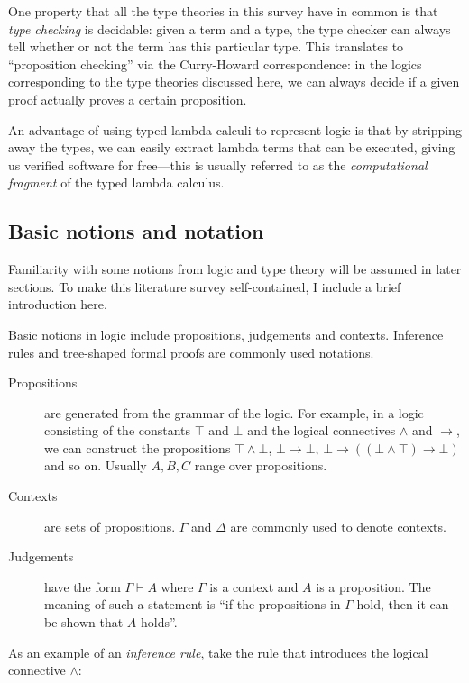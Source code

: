 \documentclass[12pt,toc=bibliography,numbers=noendperiod,
               footnotes=multiple,twoside]{scrartcl}
\begin{document}
One property that all the type theories in this survey have in common is that \emph{type checking} is decidable: given a term and a type, the type checker can always tell whether or not the term has this particular type. This translates to \enquote{proposition checking} via the Curry-Howard correspondence: in the logics corresponding to the type theories discussed here, we can always decide if a given proof actually proves a certain proposition.

An advantage of using typed lambda calculi to represent logic is that by stripping away the types, we can easily extract lambda terms that can be executed, giving us verified software for free---this is usually referred to as the \emph{computational fragment} of the typed lambda calculus.

\subsection{Basic notions and notation}

Familiarity with some notions from logic and type theory will be assumed in later sections. To make this literature survey self-contained, I include a brief introduction here.


Basic notions in logic include propositions, judgements and contexts. Inference rules and tree-shaped formal proofs are commonly used notations.

\begin{description}
\item[Propositions] are generated from the grammar of the logic. For example, in a logic consisting of the constants \(\top\) and \(\bot\) and the logical connectives \(\wedge\) and \(\rightarrow\), we can construct the propositions \(\top \wedge \bot\), \(\bot \rightarrow \bot\), \(\bot \rightarrow ((\bot \wedge \top) \rightarrow \bot)\) and so on. Usually \(A, B, C\) range over propositions.
\item[Contexts] are sets of propositions. \(\Gamma\) and \(\Delta\) are commonly used to denote contexts.
\item[Judgements] have the form \(\Gamma \vdash A\) where \(\Gamma\) is a context and \(A\) is a proposition. The meaning of such a statement is \enquote{if the propositions in \(\Gamma\) hold, then it can be shown that \(A\) holds}.
\end{description}

As an example of an \emph{inference rule}, take the rule that introduces the logical connective \(\wedge\):
\end{document}
